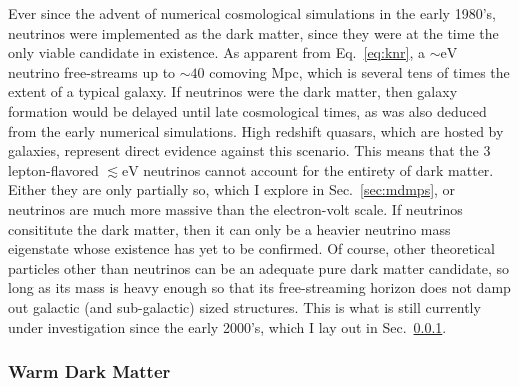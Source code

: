 Ever since the advent of numerical cosmological simulations in the early 1980's, neutrinos were implemented as the dark matter, since they were at the time the only viable candidate in existence. As apparent from Eq.~\ref{eq:knr}, a $\sim \mathrm{eV}$ neutrino free-streams up to $\sim 40$ comoving Mpc, which is several tens of times the extent of a typical galaxy. If neutrinos were the dark matter, then galaxy formation would be delayed until late cosmological times, as was also deduced from the early numerical simulations. High redshift quasars, which are hosted by galaxies, represent direct evidence against this scenario. This means that the 3 lepton-flavored $\lesssim \mathrm{eV}$ neutrinos cannot account for the entirety of dark matter. Either they are only partially so, which I explore in Sec.~\ref{sec:mdmps}, or neutrinos are much more massive than the electron-volt scale. If neutrinos consititute the dark matter, then it can only be a heavier neutrino mass eigenstate whose existence has yet to be confirmed. Of course, other theoretical particles other than neutrinos can be an adequate pure dark matter candidate, so long as its mass is heavy enough so that its free-streaming horizon does not damp out galactic (and sub-galactic) sized structures. This is what is still currently under investigation since the early 2000's, which I lay out in Sec.~\ref{sec:warmy}.


\subsubsection{Warm Dark Matter}
\label{sec:warmy}

